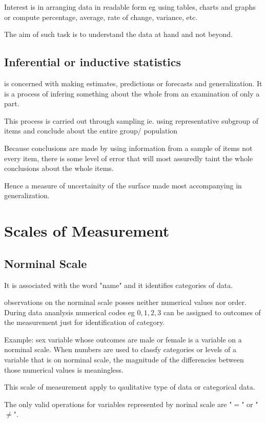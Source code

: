 \documentclass[12pt]{article}
\begin{document}
Interest is in arranging data in readable form eg using tables, charts and graphs or compute percentage, average, rate of change, variance, etc.

The aim of such task is to understand the data at hand and not beyond.

\subsection{Inferential or inductive statistics}
is concerned with making estimates, predictions or forecasts and generalization.
It is  a process of infering something about the whole from an examination of only a part.

This process is carried out through sampling ie. using representative subgroup of items and conclude about the entire group/ population

Because conclusions are made by using information from a sample of items not every item, there is some level of error that will most assuredly taint the whole conclusions about the whole items.

Hence a measure of uncertainity of the surface made most accompanying in generalization.
\newpage

\section{Scales of Measurement}%

\subsection{Norminal Scale}
It is associated with the word "name" and it identifies categories of data.

observations on the norminal scale posses neither numerical values nor order.
During data ananlysis numerical codes eg $0, 1, 2, 3$ can be assigned to outcomes of the measurement just for identification of category.

Example: sex variable whose outcomes are male or female is a variable on a norminal scale.
When numbers are used to classfy categories or levels of a variable that is on norminal scale, the magnitude of the differencies between those numerical values is meaningless.

This scale of measurement apply to qaulitative type of data or categorical data.

The only valid operations for variables represented by norinal scale are "$=$" or "$\neq$".
\end{document}
